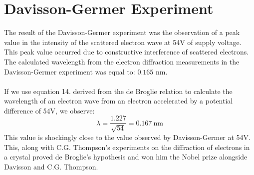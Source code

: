 \documentclass{article}
\begin{document}
\section{Davisson-Germer Experiment}
The result of the Davisson-Germer experiment was the observation of a peak value in the intensity of the scattered electron wave at 54V of supply voltage. This peak value occurred due to constructive interference of scattered electrons. The calculated wavelength from the electron diffraction measurements in the Davisson-Germer experiment was equal to: $0.165$ nm.  \\ \\

If we use equation 14. derived from the de Broglie relation to calculate the wavelength of an electron wave from an electron accelerated by a potential difference of 54V, we observe:
\begin{equation}
    \lambda = \frac{1.227}{\sqrt{54}} = 0.167 \ \text{nm}
\end{equation}
This value is shockingly close to the value observed by Davisson-Germer at 54V. This, along with C.G. Thompson's experiments on the diffraction of electrons in a crystal proved de Broglie's hypothesis and won him the Nobel prize alongside Davisson and C.G. Thompson. 
\end{document}
